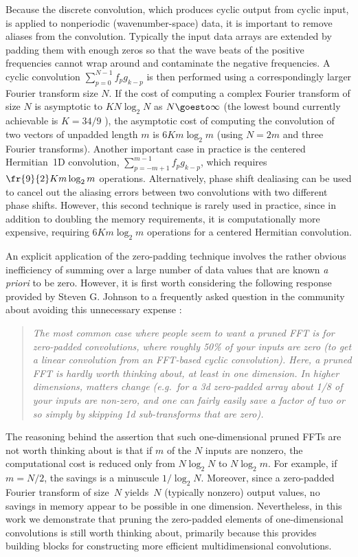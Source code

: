 \documentclass[final]{siamltex}
\begin{document}
Because the discrete convolution, which produces cyclic output from cyclic
input, is applied to nonperiodic (wavenumber-space) data, it is important
to remove aliases from the convolution. Typically the input data arrays are
extended by padding them with enough zeros so that the wave beats of
the positive frequencies cannot wrap around and contaminate
the negative frequencies. A cyclic convolution $\sum_{p=0}^{N-1} f_p g_{k-p}$ 
is then performed using a
correspondingly larger Fourier transform size $N$. If the cost of 
computing a complex Fourier transform of size $N$ is asymptotic to 
$K N\log_2 N$ as \hbox{$N\goesto\infty$} (the lowest bound currently 
achievable is $K=34/9$ \cite{Johnson07,Lundy07}), the asymptotic cost of
computing the convolution of two vectors of unpadded length $m$ is
$6Km\log_2 m$ (using $N=2m$ and three Fourier transforms).
Another important case in practice is the centered Hermitian~1D convolution,
$\sum_{p=-m+1}^{m-1} f_p g_{k-p}$, which requires $\fr{9}{2}Km\log_2 m$
operations.
Alternatively, phase shift dealiasing \cite{Patterson71,Canuto06} can be used
to cancel out the aliasing errors between two convolutions with two
different phase shifts. However, this second technique is rarely used in
practice, since in addition to doubling the memory requirements, it is
computationally more expensive, requiring $6K m\log_2 m$ operations for a 
centered Hermitian convolution.

An explicit application of the zero-padding technique involves the rather
obvious inefficiency of summing over a large number of data values that
are known {\it a priori\/} to be zero.
However, it is first worth considering the following response
provided by Steven G. Johnson to a frequently asked question in the
community about avoiding this unnecessary
expense \cite{fftwprune}:
\begin{quotation}\label{Johnson}
{\it
The most common case where people seem to want a pruned FFT is for
zero-padded convolutions, where roughly 50\% of your inputs are zero (to
get a linear convolution from an FFT-based cyclic convolution). Here, a
pruned FFT is hardly worth thinking about, at least in one dimension. In
higher dimensions, matters change (e.g.\ for a 3d zero-padded array about
1/8 of your inputs are non-zero, and one can fairly easily save a factor of
two or so simply by skipping 1d sub-transforms that are zero).
}
\end{quotation}

The reasoning behind the assertion that such one-dimensional pruned FFTs
are not worth thinking about is that if $m$ of the $N$ inputs are nonzero,
the computational cost is reduced only from $N\log_2 N$ to $N\log_2 m$.
For example, if $m=N/2$, the savings is a minuscule $1/\log_2 N$.
Moreover, since a zero-padded Fourier transform of size~$N$ yields~$N$
(typically nonzero) output values, no savings in memory appear to be
possible in one dimension. Nevertheless, in this work we demonstrate that
pruning the zero-padded elements of one-dimensional convolutions is still
worth thinking about, primarily because this provides building blocks
for constructing more efficient multidimensional convolutions.
\end{document}
